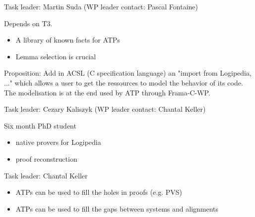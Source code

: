 \begin{workpackage}
\begin{tasklist}
\begin{task}[id=deduktitoatp, title=Translate Dedukti statements into ATPs inputs]
\end{task}


\begin{task}[id=library, title=Logipedia as a source of knowledge for ATP]
  Task leader: Martin Suda (WP leader contact: Pascal Fontaine)

  
Depends on T3.

\begin{itemize}
\item A library of known facts for ATPs
\item Lemma selection is crucial
\end{itemize}

Proposition: Add in ACSL (C specification language) an "import from
Logipedia, ..." which allows a user to get the ressources to model the
behavior of its code. The modelisation is at the end used by ATP through
Frama-C-WP.

\end{task}


\begin{task}[id=reconstruction, title=ATPs for Logipedia]
  Task leader: Cezary Kaliszyk (WP leader contact: Chantal Keller)


  Six month PhD student

\begin{itemize}
\item native provers for Logipedia
\item proof reconstruction
\end{itemize}

\end{task}


\begin{task}[id=readiness, title=Using ATPs to increase Logipedia readiness]
  Task leader: Chantal Keller


\begin{itemize}
\item ATPs can be used to fill the holes in proofs (e.g. PVS)
\item ATPs can be used to fill the gaps between systems and alignments
\end{itemize}

\end{task}



\end{tasklist}
\end{workpackage}
